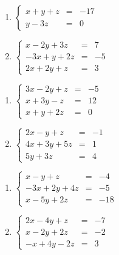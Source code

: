 \documentclass{ximera}
\begin{document}
\begin{multicols}{2}
\begin{enumerate}
\setcounter{enumi}{\value{HW}}

\item $\left\{ \begin{array}{rcr} x + y + z & = & -17  \\ y - 3z & = & 0  \end{array} \right.$


\item $\left\{ \begin{array}{rcr} x-2y+3z & = & 7 \\ -3x+y+2z & = & -5 \\ 2x+2y+z & = & 3  \end{array} \right.$


\setcounter{HW}{\value{enumi}}
\end{enumerate}
\end{multicols}



\begin{multicols}{2}
\begin{enumerate}
\setcounter{enumi}{\value{HW}}


\item $\left\{ \begin{array}{rcr} 3x-2y+z & = & -5 \\ x+3y-z & = & 12 \\ x+y+2z & = & 0  \end{array} \right.$
\item $\left\{ \begin{array}{rcr} 2x-y+z& = & -1 \\ 4x+3y+5z & = & 1 \\  5y+3z & = & 4 \end{array} \right.$


\setcounter{HW}{\value{enumi}}
\end{enumerate}
\end{multicols}



\begin{multicols}{2}
\begin{enumerate}
\setcounter{enumi}{\value{HW}}


\item $\left\{ \begin{array}{rcr} x-y+z & = & -4 \\ -3x+2y+4z & = & -5 \\ x-5y+2z & = & -18  \end{array} \right.$
\item $\left\{ \begin{array}{rcr} 2x-4y+z & = & -7 \\ x-2y+2z & = & -2 \\ -x+4y-2z & = & 3  \end{array} \right.$


\setcounter{HW}{\value{enumi}}
\end{enumerate}
\end{multicols}
\end{document}
